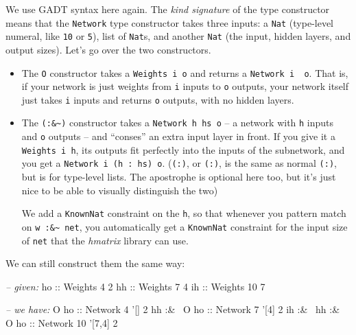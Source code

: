 \documentclass[]{article}
\newenvironment{Shaded}{}{}
\newcommand{\DataTypeTok}[1]{\textcolor[rgb]{0.56,0.13,0.00}{{#1}}}
\newcommand{\DecValTok}[1]{\textcolor[rgb]{0.25,0.63,0.44}{{#1}}}
\newcommand{\CharTok}[1]{\textcolor[rgb]{0.25,0.44,0.63}{{#1}}}
\newcommand{\CommentTok}[1]{\textcolor[rgb]{0.38,0.63,0.69}{\textit{{#1}}}}
\newcommand{\OtherTok}[1]{\textcolor[rgb]{0.00,0.44,0.13}{{#1}}}
\newcommand{\FunctionTok}[1]{\textcolor[rgb]{0.02,0.16,0.49}{{#1}}}
\newcommand{\NormalTok}[1]{{#1}}
\begin{document}
We use GADT syntax here again. The \emph{kind signature} of the type
constructor means that the \texttt{Network} type constructor takes three
inputs: a \texttt{Nat} (type-level numeral, like \texttt{10} or
\texttt{5}), list of \texttt{Nat}s, and another \texttt{Nat} (the input,
hidden layers, and output sizes). Let's go over the two constructors.

\begin{itemize}
\item
  The \texttt{O} constructor takes a \texttt{Weights\ i\ o} and returns
  a \texttt{Network\ i\ \textquotesingle{}{[}{]}\ o}. That is, if your
  network is just weights from \texttt{i} inputs to \texttt{o} outputs,
  your network itself just takes \texttt{i} inputs and returns
  \texttt{o} outputs, with no hidden layers.
\item
  The \texttt{(:\&\textasciitilde{})} constructor takes a
  \texttt{Network\ h\ hs\ o} -- a network with \texttt{h} inputs and
  \texttt{o} outputs -- and ``conses'' an extra input layer in front. If
  you give it a \texttt{Weights\ i\ h}, its outputs fit perfectly into
  the inputs of the subnetwork, and you get a
  \texttt{Network\ i\ (h\ \textquotesingle{}:\ hs)\ o}.
  (\texttt{(\textquotesingle{}:)}, or \texttt{(:)}, is the same as
  normal \texttt{(:)}, but is for type-level lists. The apostrophe is
  optional here too, but it's just nice to be able to visually
  distinguish the two)

  We add a \texttt{KnownNat} constraint on the \texttt{h}, so that
  whenever you pattern match on \texttt{w\ :\&\textasciitilde{}\ net},
  you automatically get a \texttt{KnownNat} constraint for the input
  size of \texttt{net} that the \emph{hmatrix} library can use.
\end{itemize}

We can still construct them the same way:

\begin{Shaded}
\begin{Highlighting}[]
\CommentTok{-- given:}
\OtherTok{ho ::} \DataTypeTok{Weights}  \DecValTok{4} \DecValTok{2}
\OtherTok{hh ::} \DataTypeTok{Weights}  \DecValTok{7} \DecValTok{4}
\OtherTok{ih ::} \DataTypeTok{Weights} \DecValTok{10} \DecValTok{7}

\CommentTok{-- we have:}
              \DataTypeTok{O}\OtherTok{ ho ::} \DataTypeTok{Network}  \DecValTok{4} \CharTok{'[] 2}
       \NormalTok{hh }\FunctionTok{:&~} \DataTypeTok{O}\OtherTok{ ho ::} \DataTypeTok{Network}  \DecValTok{7} \CharTok{'[4] 2}
\NormalTok{ih }\FunctionTok{:&~} \NormalTok{hh }\FunctionTok{:&~} \DataTypeTok{O}\OtherTok{ ho ::} \DataTypeTok{Network} \DecValTok{10} \CharTok{'[7,4] 2}
\end{Highlighting}
\end{Shaded}
\end{document}
